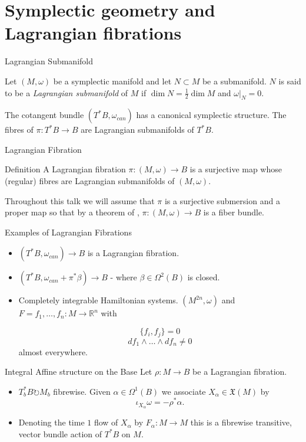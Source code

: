 \section{Symplectic geometry and Lagrangian fibrations}
\frame[c]{\sectionpage}
\begin{frame}[c]{Lagrangian Submanifold}
	\begin{definition}
		Let $(M, \omega)$ be a symplectic manifold and let $N \subset M$ be a submanifold. $N$ is said to be a \emph{Lagrangian submanifold} of $M$
		if $\dim N = \frac{1}{2}\dim M$ and $\omega|_N = 0$.
	\end{definition}
	\begin{example}
		The cotangent bundle $(T^*B, \omega_{can})$ has a canonical symplectic structure. The fibres of $\pi: T^*B \to B$ are Lagrangian submanifolds of $T^*B$.
	\end{example}
\end{frame}

\begin{frame}[c]{Lagrangian Fibration}
	\begin{kulblock}{Definition}
		A Lagrangian fibration $\pi : (M, \omega) \to B$ is a surjective map whose (regular) fibres are Lagrangian submanifolds of $(M, \omega)$.
	\end{kulblock}
	\begin{remark}
		Throughout this talk we will assume that $\pi$ is a surjective submersion and a proper map so that by a theorem of \cite{Ehresmann1951}, $\pi : (M, \omega) \to B$ is a fiber bundle.
	\end{remark}
\end{frame}

\begin{frame}[c]{Examples of Lagrangian Fibrations}
	\begin{itemize}
		\item $(T^*B, \omega_{can}) \to B$ is a Lagrangian fibration.
		\item $(T^*B, \omega_{can} + \pi^*\beta) \to B$ - where $\beta \in \Omega^2(B)$ is closed.
		\item Completely integrable Hamiltonian systems. $(M^{2n}, \omega)$ and $F=f_1, \dots
			      , f_n : M \to \mathbb{R}^n$ with

		      $$\{f_i, f_j\} = 0$$
		      $$df_1 \wedge \dots \wedge df_n \neq 0$$ almost everywhere.
	\end{itemize}
\end{frame}

\begin{frame}[c]{Integral Affine structure on the Base}
	Let $\rho: M \to B$ be a Lagrangian fibration.
	\begin{itemize}
		\item $T_b^*B \circlearrowright M_b$ fibrewise. Given $\alpha \in \Omega^1(B)$ we associate $X_{\alpha} \in \mathfrak{X}(M)$ by
		      $$ \iota_{X_{\alpha}}\omega = -\rho^*\alpha.$$
		\item Denoting the time $1$ flow of $X_{\alpha}$ by $F_{\alpha} : M \to M$ this is a
		      fibrewise transitive, vector bundle action of $T^*B$ on $M$.
	\end{itemize}
\end{frame}

